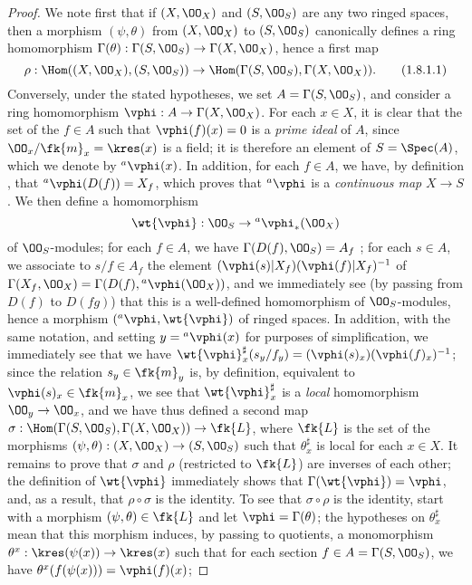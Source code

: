 \begin{proof}
\label{proof-1.1.8.1}
We note first that if $(X,\OO_X)$ and $(S,\OO_S)$ are any two ringed spaces, then a morphism $(\psi,\theta)$ from $(X,\OO_X)$ to $(S,\OO_S)$ canonically defines a ring homomorphism $\Gamma(\theta):\Gamma(S,\OO_S)\to\Gamma(X,\OO_X)$, hence a first map
\begin{equation*}
  \label{1.1.8.1.1}
  \rho:\Hom((X,\OO_X),(S,\OO_S))\to\Hom(\Gamma(S,\OO_S),\Gamma(X,\OO_X)).
  \tag{1.8.1.1}
\end{equation*}
Conversely, under the stated hypotheses, we set $A=\Gamma(S,\OO_S)$, and consider a ring homomorphism $\vphi:A\to\Gamma(X,\OO_X)$.
For each $x\in X$, it is clear that the set of the $f\in A$ such that $\vphi(f)(x)=0$ is a \emph{prime ideal} of $A$, since $\OO_x/\fk{m}_x=\kres(x)$ is a field;
it is therefore an element of $S=\Spec(A)$, which we denote by ${}^a\vphi(x)$.
In addition, for each $f\in A$, we have, by definition , that ${}^a\vphi(D(f))=X_f$, which proves that ${}^a\vphi$ is a \emph{continuous map} $X\to S$.
We then define a homomorphism
\[
  \wt{\vphi}:\OO_S\to{}^a\vphi_*(\OO_X)
\]
of $\OO_S$-modules;
for each $f\in A$, we have $\Gamma(D(f),\OO_S)=A_f$ ;
for each $s\in A$, we associate to $s/f\in A_f$ the element $(\vphi(s)|X_f)(\vphi(f)|X_f)^{-1}$ of $\Gamma(X_f,\OO_X)=\Gamma(D(f),{}^a\vphi(\OO_X))$, and we immediately see (by passing from $D(f)$ to $D(fg)$) that this is a well-defined homomorphism of $\OO_S$-modules, hence a morphism $({}^a\vphi,\wt{\vphi})$ of ringed spaces.
In addition, with the same notation, and setting $y={}^a\vphi(x)$ for purposes of simplification, we immediately see  that we have $\wt{\vphi}_x^\sharp(s_y/f_y)=(\vphi(s)_x)(\vphi(f)_x)^{-1}$;
since the relation $s_y\in\fk{m}_y$ is, by definition, equivalent to $\vphi(s)_x\in\fk{m}_x$, we see that $\wt{\vphi}_x^\sharp$ is a \emph{local} homomorphism $\OO_y\to\OO_x$, and we have thus defined a second map $\sigma:\Hom(\Gamma(S,\OO_S),\Gamma(X,\OO_X))\to\fk{L}$, where $\fk{L}$ is the set of the morphisms $(\psi,\theta):(X,\OO_X)\to(S,\OO_S)$ such that $\theta_x^\sharp$ is local for each $x\in X$.
It remains to prove that $\sigma$ and $\rho$ (restricted to $\fk{L}$) are inverses of each other;
the definition of $\wt{\vphi}$ immediately shows that $\Gamma(\wt{\vphi})=\vphi$, and, as a result, that $\rho\circ\sigma$ is the identity.
To see that $\sigma\circ\rho$ is the identity, start with a morphism $(\psi,\theta)\in\fk{L}$ and let $\vphi=\Gamma(\theta)$;
the hypotheses on $\theta_x^\sharp$ mean that this morphism induces, by passing to quotients, a monomorphism $\theta^x:\kres(\psi(x))\to\kres(x)$ such that for each section $f\in A=\Gamma(S,\OO_S)$, we have $\theta^x(f(\psi(x)))=\vphi(f)(x)$;

\end{proof}
